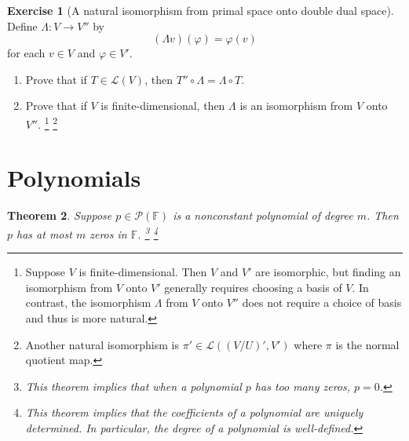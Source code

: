 \documentclass{tufte-handout}
\theoremstyle{plain} %
\newtheorem{thm}{Theorem}
\theoremstyle{definition}
\newtheorem{exer}[thm]{Exercise}
\theoremstyle{remark}
\newcommand{\bra}[1]{\mathopen{}\left(#1\right)}
\renewcommand{\phi}{\varphi}
\newcommand{\F}{\mathbb{F}}
\renewcommand{\L}{\mathcal{L}}
\renewcommand{\P}{\mathcal{P}}
\begin{document}
\begin{exer}[A natural isomorphism from primal space onto double dual space]
	Define $\Lambda:V\to V''$ by
	\[(\Lambda v)(\phi)=\phi(v)\]
	for each $v\in V$ and $\phi\in V'$.
	\begin{enumerate}
		\item Prove that if $T\in\L(V)$, then $T''\circ\Lambda=\Lambda\circ T$.
		\item Prove that if $V$ is finite-dimensional, then $\Lambda$ is an isomorphism from $V$ onto $V''$.%
    	\footnote{Suppose $V$ is finite-dimensional. Then $V$ and $V'$ are isomorphic, but finding an isomorphism from $V$ onto $V'$ generally requires choosing a basis of $V$. In contrast, the isomorphism $\Lambda$ from $V$ onto $V''$ does not require a choice of basis and thus is more natural.}%
		\footnote{Another natural isomorphism is $\pi'\in\L\bra{(V/U)',V'}$ where $\pi$ is the normal quotient map.}
	\end{enumerate}
\end{exer}


\section{Polynomials}

\begin{thm}
	Suppose $p\in\P(\F)$ is a nonconstant polynomial of degree $m$. Then $p$ has at most $m$ zeros in $\F$.%
	\footnote{This theorem implies that when a polynomial $p$ has too many zeros, $p=0$.}%
    \footnote{This theorem implies that the coefficients of a polynomial are uniquely determined. In particular, the \emph{degree} of a polynomial is well-defined.}
\end{thm}
\end{document}
